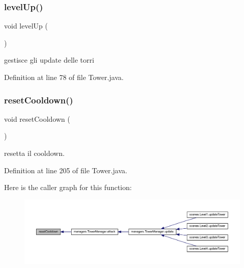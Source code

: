 \subsubsection{\texorpdfstring{level\+Up()}{levelUp()}}
{\footnotesize\ttfamily void level\+Up (\begin{DoxyParamCaption}{ }\end{DoxyParamCaption})}



gestisce gli update delle torri 



Definition at line 78 of file Tower.\+java.

\mbox{\label{classtowers_1_1_tower_ac49a5c9f0a8fcb8b68449da989b93542}} 
\subsubsection{\texorpdfstring{reset\+Cooldown()}{resetCooldown()}}
{\footnotesize\ttfamily void reset\+Cooldown (\begin{DoxyParamCaption}{ }\end{DoxyParamCaption})}



resetta il cooldown. 



Definition at line 205 of file Tower.\+java.

Here is the caller graph for this function\+:\nopagebreak
\begin{figure}[H]
\begin{center}
\leavevmode
\includegraphics[width=350pt]{classtowers_1_1_tower_ac49a5c9f0a8fcb8b68449da989b93542_icgraph}
\end{center}
\end{figure}
\mbox{\label{classtowers_1_1_tower_a120aaa641fb05cbcbe27057048519fa7}} 
